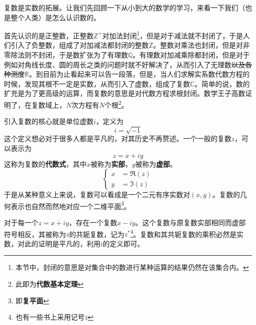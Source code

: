 \documentclass[12pt,a4paper,openany,twoside]{book}
\numberwithin{equation}{section}
\begin{document}
            复数是实数的拓展。让我们先回顾一下从小到大的数学的学习，来看一下我们（也是整个人类）是怎么认识数的。
            
            首先认识的是正整数，正整数$\mathbb{Z}^+$对加法封闭\footnote{本节中，封闭的意思是对集合中的数进行某种运算的结果仍然在该集合内。}，但是对于减法就不封闭了，于是人们引入了负整数，组成了对加减法都封闭的整数$\mathbb{Z}$。整数对乘法也封闭，但是对非零除法则不封闭，于是数扩张为了有理数$\mathbb{Q}$。有理数对加减乘除都封闭，但是对于例如对角线长度、圆的周长之类的问题时就不好解决了，从而引入了无理数\sout{以及各种测度}$\mathbb{R}$。到目前为止看起来可以告一段落，但是，当人们求解实系数代数方程的时候，发现其根不一定是实数，从而引入了虚数，组成了复数$\mathbb{C}$。简单的说，数的扩充是为了更高级的运算，而复数的意思是对代数方程求根封闭。数学王子高数证明了，在复数域上，$N$次方程有$N$个根\footnote{此即为\textbf{代数基本定理}}。
            
            引入复数的核心就是单位虚数$i$，定义为
            \begin{equation}
              i=\sqrt{-1}
            \end{equation}
            这个定义想必对于很多人都是平凡的，对其历史不再赘述。一个一般的复数$z$，可以表示为
            \begin{equation}
              z=x+iy
            \end{equation}
            这称为复数的\textbf{代数式}，其中$x$被称为\textbf{实部}，$y$被称为\textbf{虚部}。
            \begin{equation}
              \begin{cases}
                x&=\Re(z)\\
                y&=\Im(z)
              \end{cases}
            \end{equation}
            于是从某种意义上来说，复数可以看成是一个二元有序实数对$(x,y)$。复数的几何表示也自然而然地对应一个二维平面\footnote{即\textbf{复平面}}。

            对于每一个$z=x+iy$，存在一个复数$x-iy$。这个复数与原复数实部相同而虚部符号相反，其被称为$z$的共轭复数，记为$z^*$\footnote{也有一些书上采用记号$\bar{z}$}。复数和其共轭复数的乘积必然是实数，对此的证明是平凡的，利用$i$的定义即可。
            
\end{document}
